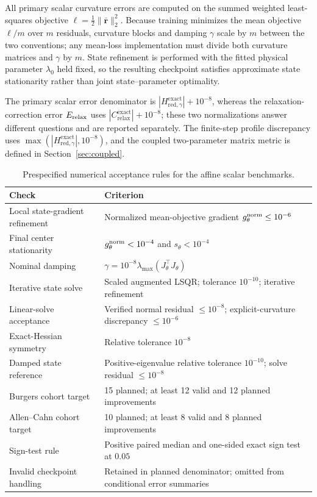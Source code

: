 \documentclass[10pt,letterpaper]{article}
\newcommand{\Hred}{H_{\mathrm{red},\gamma}^{\mathrm{exact}}}
\newcommand{\Cexact}{C_{\mathrm{relax}}^{\mathrm{exact}}}
\begin{document}
All primary scalar curvature errors are computed on the summed weighted least-squares objective $\ell=\tfrac12\|\bar{\bm r}\|_2^2$.
Because training minimizes the mean objective $\ell/m$ over $m$ residuals, curvature blocks and damping $\gamma$ scale by $m$ between the two conventions; any mean-loss implementation must divide both curvature matrices and $\gamma$ by $m$.
State refinement is performed with the fitted physical parameter $\lambda_0$ held fixed, so the resulting checkpoint satisfies approximate state stationarity rather than joint state--parameter optimality.

The primary scalar error denominator is $|\Hred|+10^{-8}$, whereas the relaxation-correction error $E_{\rm relax}$ uses $|\Cexact|+10^{-8}$; these two normalizations answer different questions and are reported separately.
The finite-step profile discrepancy uses $\max(|\Hred|,10^{-8})$, and the coupled two-parameter matrix metric is defined in Section~\ref{sec:coupled}.

\begin{table}[!htbp]
\centering\small
\caption{Prespecified numerical acceptance rules for the affine scalar benchmarks.}
\begin{tabular}{p{.36\linewidth}p{.56\linewidth}}
\toprule
Check & Criterion\\\midrule
Local state-gradient refinement & Normalized mean-objective gradient $g_\theta^{\rm norm}\le 10^{-6}$\\
Final center stationarity & $g_\theta^{\rm norm}<10^{-4}$ and $s_\theta<10^{-4}$\\
Nominal damping & $\gamma=10^{-8}\lambda_{\max}(J_\theta^\top J_\theta)$\\
Iterative state solve & Scaled augmented LSQR; tolerance $10^{-10}$; iterative refinement\\
Linear-solve acceptance & Verified normal residual $\le10^{-8}$; explicit-curvature discrepancy $\le10^{-6}$\\
Exact-Hessian symmetry & Relative tolerance $10^{-8}$\\
Damped state reference & Positive-eigenvalue relative tolerance $10^{-10}$; solve residual $\le10^{-8}$\\
Burgers cohort target & 15 planned; at least 12 valid and 12 planned improvements\\
Allen--Cahn cohort target & 10 planned; at least 8 valid and 8 planned improvements\\
Sign-test rule & Positive paired median and one-sided exact sign test at $0.05$\\
Invalid checkpoint handling & Retained in planned denominator; omitted from conditional error summaries\\
\bottomrule
\end{tabular}
\end{table}
\end{document}
